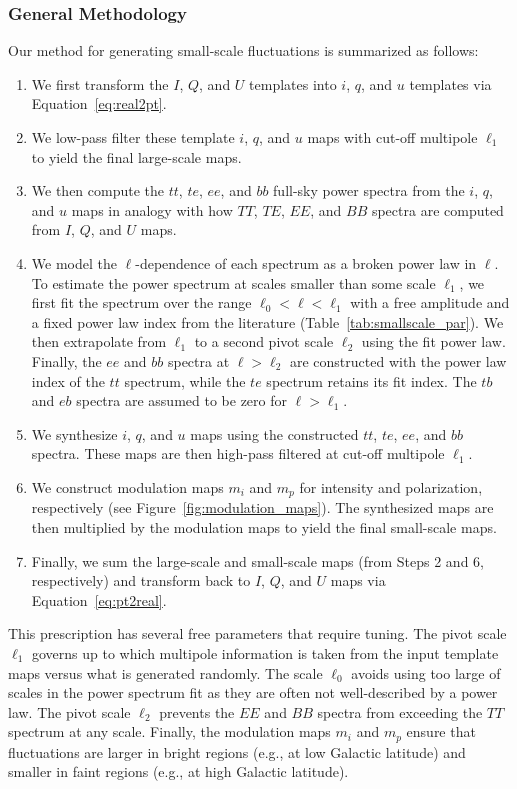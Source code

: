 \documentclass[twocolumn]{aastex631}
\begin{document}
\subsubsection{General Methodology}\label{subsec:methodology}
Our method for generating small-scale fluctuations is summarized as follows: 
\begin{enumerate}
    \item We first transform the $I$, $Q$, and $U$ templates into $i$, $q$, and $u$ templates via Equation~\eqref{eq:real2pt}.
    \item We low-pass filter these template $i$, $q$, and $u$ maps with cut-off multipole $\ell_1$ to yield the final large-scale maps.
    \item We then compute the $tt$, $te$, $ee$, and $bb$ full-sky power spectra from the $i$, $q$, and $u$ maps in analogy with how $TT$, $TE$, $EE$, and $BB$ spectra are computed from $I$, $Q$, and $U$ maps.
    \item We model the $\ell$-dependence of each spectrum as a broken power law in $\ell$. To estimate the power spectrum at scales smaller than some scale $\ell_1$, we first fit the spectrum over the range $\ell_0 < \ell < \ell_1$ with a free amplitude and a fixed power law index from the literature (Table~\ref{tab:smallscale_par}). We then extrapolate from $\ell_1$ to a second pivot scale $\ell_2$ using the fit power law. Finally, the $ee$ and $bb$ spectra at $\ell > \ell_2$ are constructed with the power law index of the $tt$ spectrum, while the $te$ spectrum retains its fit index. The $tb$ and $eb$ spectra are assumed to be zero for $\ell > \ell_1$.
    \item  We synthesize $i$, $q$, and $u$ maps using the constructed $tt$, $te$, $ee$, and $bb$ spectra. These maps are then high-pass filtered at cut-off multipole $\ell_1$.
    \item We construct modulation maps $m_i$ and $m_p$ for intensity and polarization, respectively (see Figure~\ref{fig:modulation_maps}). The synthesized maps are then multiplied by the modulation maps to yield the final small-scale maps.
    \item Finally, we sum the large-scale and small-scale maps (from Steps 2 and 6, respectively) and transform back to $I$, $Q$, and $U$ maps via Equation~\eqref{eq:pt2real}.
\end{enumerate}

This prescription has several free parameters that require tuning. The pivot scale $\ell_1$ governs up to which multipole information is taken from the input template maps versus what is generated randomly. The scale $\ell_0$ avoids using too large of scales in the power spectrum fit as they are often not well-described by a power law. The pivot scale $\ell_2$ prevents the $EE$ and $BB$ spectra from exceeding the $TT$ spectrum at any scale. Finally, the modulation maps $m_i$ and $m_p$ ensure that fluctuations are larger in bright regions (e.g., at low Galactic latitude) and smaller in faint regions (e.g., at high Galactic latitude).
\end{document}
